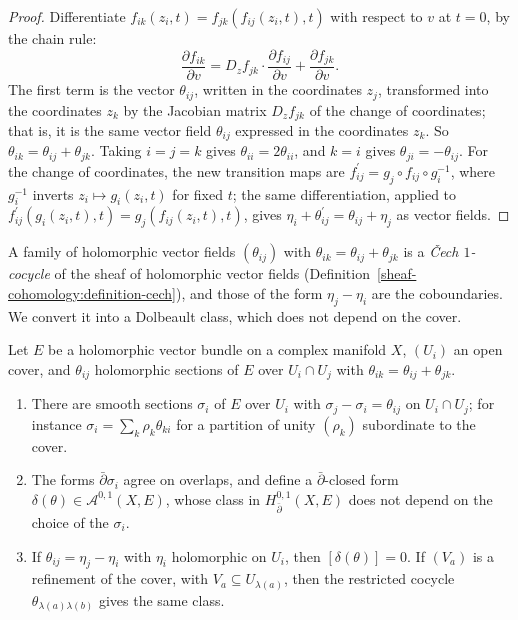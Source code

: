 \begin{proof}
Differentiate $f_{ik}(z_i, t) = f_{jk}(f_{ij}(z_i, t), t)$ with respect to $v$ at $t = 0$, by the chain rule:
\[
\frac{\partial f_{ik}}{\partial v} = D_zf_{jk}\cdot\frac{\partial f_{ij}}{\partial v} + \frac{\partial f_{jk}}{\partial v}.
\]
The first term is the vector $\theta_{ij}$, written in the coordinates $z_j$, transformed into the coordinates $z_k$ by the Jacobian matrix $D_zf_{jk}$ of the change of coordinates; that is, it is the same vector
field $\theta_{ij}$ expressed in the coordinates $z_k$. So $\theta_{ik} = \theta_{ij} + \theta_{jk}$. Taking $i = j = k$ gives $\theta_{ii} = 2\theta_{ii}$, and $k = i$ gives $\theta_{ji} = -\theta_{ij}$. For the change of
coordinates, the new transition maps are $f_{ij}^{\prime} = g_j \circ f_{ij} \circ g_i^{-1}$, where $g_i^{-1}$ inverts $z_i \mapsto g_i(z_i, t)$ for fixed $t$; the same differentiation, applied to
$f_{ij}^{\prime}(g_i(z_i, t), t) = g_j(f_{ij}(z_i, t), t)$, gives $\eta_i + \theta_{ij}^{\prime} = \theta_{ij} + \eta_j$ as vector fields.
\end{proof}

A family of holomorphic vector fields $(\theta_{ij})$ with $\theta_{ik} = \theta_{ij} + \theta_{jk}$ is a \emph{\v{C}ech $1$-cocycle} of the sheaf of holomorphic vector fields
(Definition~\ref{sheaf-cohomology:definition-cech}), and those of the form $\eta_j - \eta_i$ are the coboundaries. We convert it into a Dolbeault class, which does not depend on the cover.

\begin{lemma}\label{deformations:lemma-cech-dolbeault}
Let $E$ be a holomorphic vector bundle on a complex manifold $X$, $(U_i)$ an open cover, and $\theta_{ij}$ holomorphic sections of $E$ over $U_i \cap U_j$ with $\theta_{ik} = \theta_{ij} + \theta_{jk}$.
\begin{enumerate}
\item There are smooth sections $\sigma_i$ of $E$ over $U_i$ with $\sigma_j - \sigma_i = \theta_{ij}$ on $U_i \cap U_j$; for instance $\sigma_i = \sum_k\rho_k\theta_{ki}$ for a partition of unity $(\rho_k)$ subordinate
to the cover.
\item The forms $\bar\partial\sigma_i$ agree on overlaps, and define a $\bar\partial$-closed form $\delta(\theta) \in \mathcal{A}^{0,1}(X, E)$, whose class in $H^{0,1}_{\bar\partial}(X, E)$ does not depend on the
choice of the $\sigma_i$.
\item If $\theta_{ij} = \eta_j - \eta_i$ with $\eta_i$ holomorphic on $U_i$, then $[\delta(\theta)] = 0$. If $(V_a)$ is a refinement of the cover, with $V_a \subseteq U_{\lambda(a)}$, then the restricted cocycle
$\theta_{\lambda(a)\lambda(b)}$ gives the same class.
\end{enumerate}
\end{lemma}

